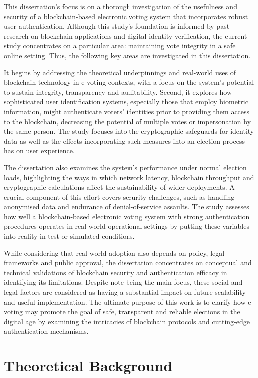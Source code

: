 \documentclass[a4paper,10pt]{report}
\begin{document}
 This dissertation’s focus is on a thorough investigation of the usefulness and security of a blockchain-based electronic voting system that incorporates robust user authentication.  Although this study’s foundation is informed by past research on blockchain applications and digital identity verification, the current study concentrates on a particular area: maintaining vote integrity in a safe online setting.  Thus, the following key areas are investigated in this dissertation.
 
 It begins by addressing the theoretical underpinnings and real-world uses of blockchain technology in e-voting contexts, with a focus on the system’s potential to sustain integrity, transparency and auditability.  Second, it explores how sophisticated user identification systems, especially those that employ biometric information, might authenticate voters’ identities prior to providing them access to the blockchain, decreasing the potential of multiple votes or impersonation by the same person.  The study focuses into the cryptographic safeguards for identity data as well as the effects incorporating such measures into an election process has on user experience.
 
 The dissertation also examines the system’s performance under normal election loads, highlighting the ways in which network latency, blockchain throughput and cryptographic calculations affect the sustainability of wider deployments.  A crucial component of this effort covers security challenges, such as handling anonymised data and endurance of denial-of-service assaults.  The study assesses how well a blockchain-based electronic voting system with strong authentication procedures operates in real-world operational settings by putting these variables into reality in test or simulated conditions.
 
 While considering that real-world adoption also depends on policy, legal frameworks and public approval, the dissertation concentrates on conceptual and technical validations of blockchain security and authentication efficacy in identifying its limitations.  Despite note being the main focus, these social and legal factors are considered as having a substantial impact on future scalability and useful implementation.  The ultimate purpose of this work is to clarify how e-voting may promote the goal of safe, transparent and reliable elections in the digital age by examining the intricacies of blockchain protocols and cutting-edge authentication mechanisms.

 \chapter{Theoretical Background}
\end{document}
